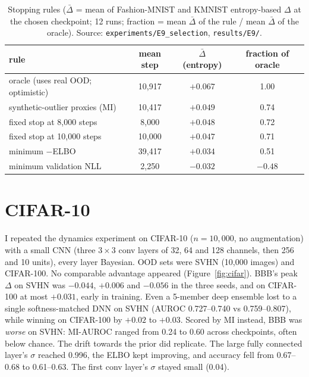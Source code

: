 \documentclass[11pt]{article}
\begin{document}
\begin{table}[!htb]
\centering\small
\begin{tabular}{lccc}
\toprule
rule & mean step & $\bar\Delta$ (entropy) & fraction of oracle \\
\midrule
oracle (uses real OOD; optimistic) & 10{,}917 & $+0.067$ & 1.00 \\
synthetic-outlier proxies (MI) & 10{,}417 & $+0.049$ & 0.74 \\
fixed stop at 8{,}000 steps & 8{,}000 & $+0.048$ & 0.72 \\
fixed stop at 10{,}000 steps & 10{,}000 & $+0.047$ & 0.71 \\
minimum $-$ELBO & 39{,}417 & $+0.034$ & 0.51 \\
minimum validation NLL & 2{,}250 & $-0.032$ & $-0.48$ \\
\bottomrule
\end{tabular}
\caption{Stopping rules ($\bar\Delta$ = mean of Fashion-MNIST and KMNIST
entropy-based $\Delta$ at the chosen checkpoint; 12 runs; fraction = mean
$\bar\Delta$ of the rule / mean $\bar\Delta$ of the oracle). Source:
\texttt{experiments/E9\_selection}, \texttt{results/E9/}.}
\label{tab:select}
\end{table}

\section{CIFAR-10}\label{sec:cifar}
I repeated the dynamics experiment on CIFAR-10 ($n=10{,}000$, no
augmentation) with a small CNN (three $3\times3$ conv layers of 32, 64 and
128 channels, then 256 and 10 units), every layer Bayesian. OOD sets were SVHN
(10{,}000 images) and CIFAR-100. No comparable advantage appeared (Figure~\ref{fig:cifar}).
BBB's peak $\Delta$ on SVHN was $-0.044$, $+0.006$ and $-0.056$ in the three
seeds, and on CIFAR-100 at most $+0.031$, early in training. Even a 5-member
deep ensemble lost to a single softness-matched DNN on SVHN (AUROC
0.727--0.740 vs 0.759--0.807), while winning on CIFAR-100 by $+0.02$ to $+0.03$.
Scored by MI instead, BBB was \emph{worse} on SVHN: MI-AUROC ranged from 0.24
to 0.60 across checkpoints, often below chance. The drift towards the prior
did replicate. The large fully connected layer's
$\sigma$ reached 0.996, the ELBO kept improving, and accuracy fell from
0.67--0.68 to 0.61--0.63. The first conv layer's $\sigma$ stayed small (0.04).
\end{document}

